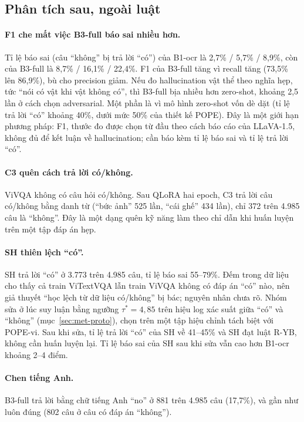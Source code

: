 \subsection{Phân tích sau, ngoài luật}

\paragraph{F1 che mất việc B3-full báo sai nhiều hơn.} Tỉ lệ báo sai (câu ``không''
bị trả lời ``có'') của B1-ocr là 2,7\% / 5,7\% / 8,9\%, còn của B3-full là 8,7\% /
16,1\% / 22,4\%. F1 của B3-full tăng vì recall tăng (73,5\% lên 86,9\%), bù cho
precision giảm. Nếu đo hallucination vật thể theo nghĩa hẹp, tức ``nói có vật khi
vật không có'', thì B3-full bịa nhiều hơn zero-shot, khoảng 2,5 lần ở cách chọn
adversarial. Một phần là vì mô hình zero-shot vốn dè dặt (tỉ lệ trả lời ``có''
khoảng 40\%, dưới mức 50\% của thiết kế POPE). Đây là một giới hạn phương pháp:
F1, thước đo được chọn từ đầu theo cách báo cáo của LLaVA-1.5, không đủ để kết
luận về hallucination; cần báo kèm tỉ lệ báo sai và tỉ lệ trả lời ``có''.

\paragraph{C3 quên cách trả lời có/không.} ViVQA không có câu hỏi có/không. Sau
QLoRA hai epoch, C3 trả lời câu có/không bằng danh từ (``bức ảnh'' 525 lần, ``cái
ghế'' 434 lần), chỉ 372 trên 4.985 câu là ``không''. Đây là một dạng quên kỹ năng
làm theo chỉ dẫn khi huấn luyện trên một tập đáp án hẹp.

\paragraph{SH thiên lệch ``có''.} SH trả lời ``có'' ở 3.773 trên 4.985 câu, tỉ lệ
báo sai 55--79\%. Đếm trong dữ liệu cho thấy cả train ViTextVQA lẫn train ViVQA
không có đáp án ``có'' nào, nên giả thuyết ``học lệch từ dữ liệu có/không'' bị
bác; nguyên nhân chưa rõ. Nhóm sửa ở lúc suy luận bằng ngưỡng $\tau^* = 4{,}85$
trên hiệu log xác suất giữa ``có'' và ``không'' (mục~\ref{sec:met-proto}), chọn
trên một tập hiệu chỉnh tách biệt với POPE-vi. Sau khi sửa, tỉ lệ trả lời ``có''
của SH về 41--45\% và SH đạt luật R-YB, không cần huấn luyện lại. Tỉ lệ báo sai
của SH sau khi sửa vẫn cao hơn B1-ocr khoảng 2--4 điểm.

\paragraph{Chen tiếng Anh.} B3-full trả lời bằng chữ tiếng Anh ``no'' ở 881 trên
4.985 câu (17,7\%), và gần như luôn đúng (802 câu ở câu có đáp án ``không'').


